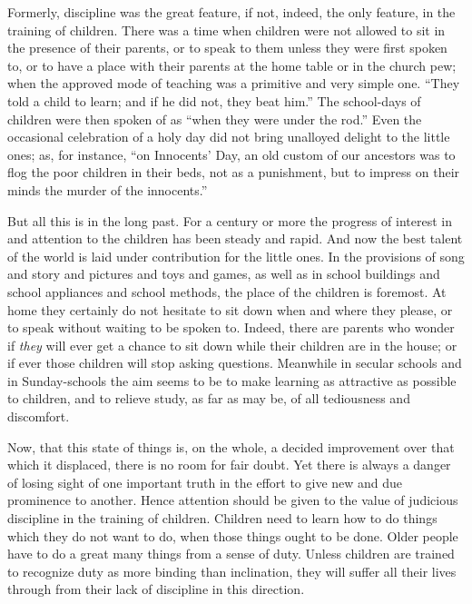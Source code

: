 \documentclass[
]{book}
\begin{document}
Formerly, discipline was the great feature, if not, indeed, the only feature, in the training of children. There was a time when children were not allowed to sit in the presence of their parents, or to speak to them unless they were first spoken to, or to have a place with their parents at the home table or in the church pew; when the approved mode of teaching was a primitive and very simple one. ``They told a child to learn; and if he did not, they beat him.'' The school-days of children were then spoken of as ``when they were under the rod.'' Even the occasional celebration of a holy day did not bring unalloyed delight to the little ones; as, for instance, ``on Innocents' Day, an old custom of our ancestors was to flog the poor children in their beds, not as a punishment, but to impress on their minds the murder of the innocents.''

But all this is in the long past. For a century or more the progress of interest in and attention to the children has been steady and rapid. And now the best talent of the world is laid under contribution for the little ones. In the provisions of song and story and pictures and toys and games, as well as in school buildings and school appliances and school methods, the place of the children is foremost. At home they certainly do not hesitate to sit down when and where they please, or to speak without waiting to be spoken to. Indeed, there are parents who wonder if \emph{they} will ever get a chance to sit down while their children are in the house; or if ever those children will stop asking questions. Meanwhile in secular schools and in Sunday-schools the aim seems to be to make learning as attractive as possible to children, and to relieve study, as far as may be, of all tediousness and discomfort.

Now, that this state of things is, on the whole, a decided improvement over that which it displaced, there is no room for fair doubt. Yet there is always a danger of losing sight of one important truth in the effort to give new and due prominence to another. Hence attention should be given to the value of judicious discipline in the training of children. Children need to learn how to do things which they do not want to do, when those things ought to be done. Older people have to do a great many things from a sense of duty. Unless children are trained to recognize duty as more binding than inclination, they will suffer all their lives through from their lack of discipline in this direction.
\end{document}

